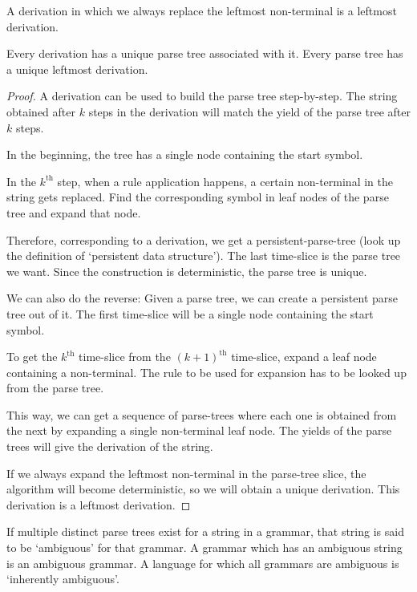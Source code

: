\begin{definition}
A derivation in which we always replace the leftmost non-terminal is a leftmost derivation.
\end{definition}
\begin{theorem}
Every derivation has a unique parse tree associated with it.
Every parse tree has a unique leftmost derivation.
\end{theorem}
\begin{proof}
A derivation can be used to build the parse tree step-by-step.
The string obtained after $k$ steps in the derivation will match
the yield of the parse tree after $k$ steps.

In the beginning, the tree has a single node containing the start symbol.

In the $k^{\textrm{th}}$ step, when a rule application happens,
a certain non-terminal in the string gets replaced.
Find the corresponding symbol in leaf nodes of the parse tree
and expand that node.

Therefore, corresponding to a derivation,
we get a persistent-parse-tree (look up the definition of `persistent data structure').
The last time-slice is the parse tree we want.
Since the construction is deterministic, the parse tree is unique.

We can also do the reverse:
Given a parse tree, we can create a persistent parse tree out of it.
The first time-slice will be a single node containing the start symbol.

To get the $k^{\textrm{th}}$ time-slice from the $(k+1)^{\textrm{th}}$ time-slice,
expand a leaf node containing a non-terminal.
The rule to be used for expansion has to be looked up from the parse tree.

This way, we can get a sequence of parse-trees where each one is obtained
from the next by expanding a single non-terminal leaf node.
The yields of the parse trees will give the derivation of the string.

If we always expand the leftmost non-terminal in the parse-tree slice,
the algorithm will become deterministic, so we will obtain a unique derivation.
This derivation is a leftmost derivation.
\end{proof}

\begin{definition}
If multiple distinct parse trees exist for a string in a grammar, that string is said to be `ambiguous' for that grammar.
A grammar which has an ambiguous string is an ambiguous grammar.
A language for which all grammars are ambiguous is `inherently ambiguous'.
\end{definition}

